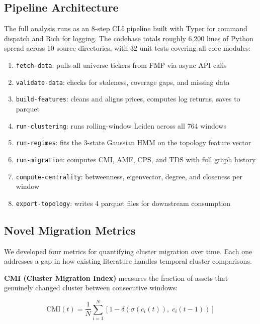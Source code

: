 \documentclass[12pt, letterpaper]{article}
\begin{document}
\subsection{Pipeline Architecture}

The full analysis runs as an 8-step CLI pipeline built with Typer for command dispatch and Rich for logging. The codebase totals roughly 6,200 lines of Python spread across 10 source directories, with 32 unit tests covering all core modules:

\begin{enumerate}
    \item \texttt{fetch-data}: pulls all universe tickers from FMP via async API calls
    \item \texttt{validate-data}: checks for staleness, coverage gaps, and missing data
    \item \texttt{build-features}: cleans and aligns prices, computes log returns, saves to parquet
    \item \texttt{run-clustering}: runs rolling-window Leiden across all 764 windows
    \item \texttt{run-regimes}: fits the 3-state Gaussian HMM on the topology feature vector
    \item \texttt{run-migration}: computes CMI, AMF, CPS, and TDS with full graph history
    \item \texttt{compute-centrality}: betweenness, eigenvector, degree, and closeness per window
    \item \texttt{export-topology}: writes 4 parquet files for downstream consumption
\end{enumerate}

\subsection{Novel Migration Metrics}

We developed four metrics for quantifying cluster migration over time. Each one addresses a gap in how existing literature handles temporal cluster comparisons.

\textbf{CMI (Cluster Migration Index)} measures the fraction of assets that genuinely changed cluster between consecutive windows:

\begin{equation}
    \text{CMI}(t) = \frac{1}{N} \sum_{i=1}^{N} \left[ 1 - \delta\!\left(\sigma\!\left(c_i(t)\right),\; c_i(t-1)\right) \right]
\end{equation}
\end{document}
